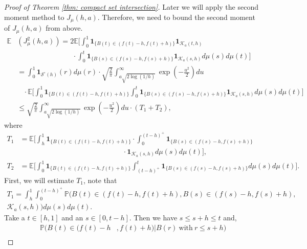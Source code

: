 \documentclass[11pt, reqno]{amsart}
\theoremstyle{plain}
\theoremstyle{definition}
\theoremstyle{remark}
\begin{document}
\begin{proof}[Proof of Theorem \ref{thm: compact set intersection}]
Later we will apply the second moment method to $J_{\mu}(h,a)$. Therefore, we need to bound the second moment of $J_{\mu}(h,a)$ from above.
\begin{align} \label{second moment upper bound estimate with T_1 and T_2}
{\mathbb{E}}  &(J^2_{\mu}(h,a)) =  2 {\mathbb{E}} \Big[ \int_0^1 {\mathbf{1}}_{\{  B(t) \in (f(t)-h, f(t)+h) \}} {\mathbf{1}}_{{\mathcal{K}}_a(t,h)} \nonumber\\ &\ \ \ \ \ \ \ \ \ \ \ \ \ \ \ \ \ \ \ \ \ \ \ \  \ \ \ \ \ \ \ \ \ \ \ \cdot\int_0^t {\mathbf{1}}_{\{  B(s) \in (f(s)-h, f(s)+h) \}} {\mathbf{1}}_{ {\mathcal{K}}_a(s,h)} d\mu(s)d\mu(t) \Big ] \nonumber\\
&= \int_0^1 {\mathbf{1}}_{ {\mathcal{S}}^\circ(h)  }(r)d\mu (r) \cdot \sqrt{\frac{2}{\pi}}\int_{a\sqrt{2\log(1/h)}}^\infty \exp(-\frac{u^2}{2}) du \nonumber\\ 
& \ \ \ \: \cdot {\mathbb{E}} \Big[ \int_0^1 {\mathbf{1}}_{\{  B(t) \in (f(t)-h, f(t)+h) \}}   \int_0^t {\mathbf{1}}_{\{  B(s) \in (f(s)-h, f(s)+h) \}} {\mathbf{1}}_{ {\mathcal{K}}_a(s,h)} d\mu(s)d\mu(t) \Big ] \nonumber
\\
&\leq \sqrt{\frac{2}{\pi}}\int_{a\sqrt{2\log(1/h)}}^\infty \exp(-\frac{u^2}{2}) du \cdot (T_1 + T_2),
\end{align}
where
\begin{align*}
T_1 &= {\mathbb{E}} \Big[ \int_h^1 {\mathbf{1}}_{\{  B(t) \in (f(t)-h, f(t)+h) \}}  
\cdot \int_0^{(t-h)^+} {\mathbf{1}}_{\{  B(s) \in (f(s)-h, f(s)+h) \}}  \\
& \ \ \ \ \ \ \ \  \ \ \ \ \ \ \ \ \ \ \ \ \ \ \ \ \ \ \  \ \ \ \ \ \ \ \ \ \ \ \ \ \ \ \ \ \ \ \ \ \ \ \ \ \ \ \ \ \ \ \ \ \ \ \ \ \ \cdot{\mathbf{1}}_{{\mathcal{K}}_a(s,h)} d\mu(s)d\mu(t) \Big ], \\
T_2 &= {\mathbb{E}} \Big[ \int_0^1 {\mathbf{1}}_{\{  B(t) \in (f(t)-h, f(t)+h) \}}  \int_{(t-h)^+}^t {\mathbf{1}}_{\{  B(s) \in (f(s)-h, f(s)+h) \}} d\mu(s)d\mu(t) \Big ].
\end{align*}
First, we will estimate $T_1$, note that
\begin{multline*}
T_1 = \int_h^1 \int_0^{(t-h)^+} {\mathbb{P}}  \Big( B(t) \in (f(t)-h, f(t)+h) , B(s) \in (f(s)-h, f(s)+h),\\ {\mathcal{K}}_a(s,h) \Big)  d\mu(s)d\mu(t).
\end{multline*}
Take a $t\in[h,1]$ and an $s \in [0,t-h]$. Then we have $s\leq s+h \leq t$ and,
\begin{align*}
{\mathbb{P}} (B(t)\in (f(t)-h&, f(t)+h) | B(r) \ \text{with} \ r \leq s+h)\\

\end{align*}
\end{proof}
\end{document}
